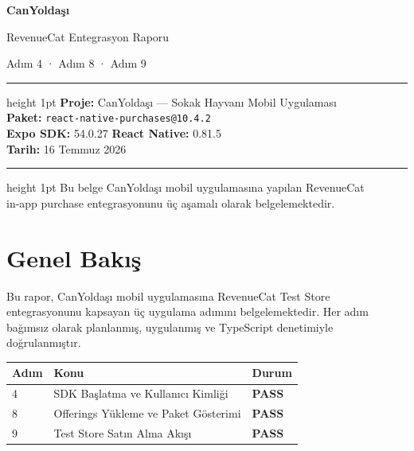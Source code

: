 \documentclass[12pt,a4paper]{article}
\begin{document}
\begin{titlepage}
  \centering
  \vspace*{3cm}
  {\Huge\bfseries\color{primary} CanYoldaşı\par}
  \vspace{0.5cm}
  {\Large RevenueCat Entegrasyon Raporu\par}
  \vspace{0.3cm}
  {\large Adım 4 · Adım 8 · Adım 9\par}
  \vspace{1.5cm}
  \hrule height 1pt
  \vspace{0.4cm}
  {\normalsize
    \textbf{Proje:} CanYoldaşı — Sokak Hayvanı Mobil Uygulaması\\[4pt]
    \textbf{Paket:} \texttt{react-native-purchases@10.4.2}\\[4pt]
    \textbf{Expo SDK:} 54.0.27 \quad \textbf{React Native:} 0.81.5\\[4pt]
    \textbf{Tarih:} 16 Temmuz 2026
  }
  \vspace{0.4cm}
  \hrule height 1pt
  \vfill
  {\small\color{codegray}
    Bu belge CanYoldaşı mobil uygulamasına yapılan RevenueCat\\
    in-app purchase entegrasyonunu üç aşamalı olarak belgelemektedir.
  }
\end{titlepage}

\tableofcontents
\newpage

\section{Genel Bakış}

Bu rapor, CanYoldaşı mobil uygulamasına RevenueCat Test Store entegrasyonunu
kapsayan üç uygulama adımını belgelemektedir.
Her adım bağımsız olarak planlanmış, uygulanmış ve TypeScript denetimiyle doğrulanmıştır.

\begin{center}
\begin{tabular}{lll}
  \toprule
  \textbf{Adım} & \textbf{Konu} & \textbf{Durum}\\
  \midrule
  4  & SDK Başlatma ve Kullanıcı Kimliği & \textcolor{successgreen}{\bfseries PASS}\\
  8  & Offerings Yükleme ve Paket Gösterimi & \textcolor{successgreen}{\bfseries PASS}\\
  9  & Test Store Satın Alma Akışı & \textcolor{successgreen}{\bfseries PASS}\\
  \bottomrule
\end{tabular}
\end{center}
\end{document}
